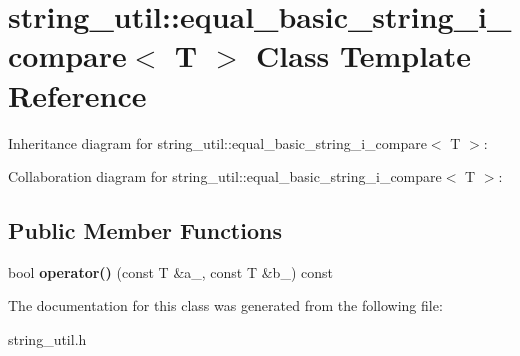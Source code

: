\section{string\+\_\+util\+:\+:equal\+\_\+basic\+\_\+string\+\_\+i\+\_\+compare$<$ T $>$ Class Template Reference}
\label{classstring__util_1_1equal__basic__string__i__compare}


Inheritance diagram for string\+\_\+util\+:\+:equal\+\_\+basic\+\_\+string\+\_\+i\+\_\+compare$<$ T $>$\+:


Collaboration diagram for string\+\_\+util\+:\+:equal\+\_\+basic\+\_\+string\+\_\+i\+\_\+compare$<$ T $>$\+:
\subsection*{Public Member Functions}
\begin{DoxyCompactItemize}
\item 
bool {\bfseries operator()} (const T \&a\+\_\+, const T \&b\+\_\+) const \label{classstring__util_1_1equal__basic__string__i__compare_a29fabe519d28908f5b72dcb799cac64f}

\end{DoxyCompactItemize}


The documentation for this class was generated from the following file\+:\begin{DoxyCompactItemize}
\item 
string\+\_\+util.\+h\end{DoxyCompactItemize}
